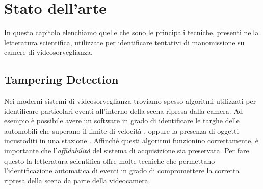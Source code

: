 \chapter{Stato dell'arte}
\label{StatoArte}
\thispagestyle{empty}

\vspace{0.5cm}

\noindent In questo capitolo elenchiamo quelle che sono le principali tecniche, presenti nella letteratura scientifica, utilizzate per identificare tentativi di manomissione su camere di videosorveglianza. 
\section{Tampering Detection}
Nei moderni sistemi di videosorveglianza troviamo spesso algoritmi utilizzati per identificare particolari eventi all'interno della scena ripresa dalla camera. 
Ad esempio \`e possibile avere un software in grado di identificare le targhe delle automobili che superano il limite di velocit\`a , oppure la presenza di oggetti incustoditi in una stazione \cite{Targhe}.
Affinch\'e questi algoritmi funzionino correttamente, \`e importante che l'\textit{affidabilit\`a} del sistema di acquisizione sia preservata.
Per fare questo la letteratura scientifica offre molte tecniche che permettano l'identificazione automatica di eventi in grado di compromettere la corretta ripresa della scena da parte della videocamera.
